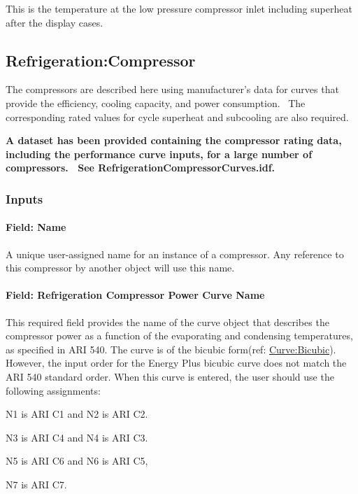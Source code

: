 This is the temperature at the low pressure compressor inlet including superheat after the display cases.

\subsection{Refrigeration:Compressor}\label{refrigerationcompressor}

The compressors are described here using manufacturer's data for curves that provide the efficiency, cooling capacity, and power consumption.~ The corresponding rated values for cycle superheat and subcooling are also required.

\textbf{A dataset has been provided containing the compressor rating data, including the performance curve inputs, for a large number of compressors.~ See RefrigerationCompressorCurves.idf.}

\subsubsection{Inputs}\label{inputs-5-023}

\paragraph{Field: Name}\label{field-name-6-017}

A unique user-assigned name for an instance of a compressor. Any reference to this compressor by another object will use this name.

\paragraph{Field: Refrigeration Compressor Power Curve Name}\label{field-refrigeration-compressor-power-curve-name}

This required field provides the name of the curve object that describes the compressor power as a function of the evaporating and condensing temperatures, as specified in ARI 540. The curve is of the bicubic form(ref: \hyperref[curvebicubic]{Curve:Bicubic}).~ However, the input order for the Energy Plus bicubic curve does not match the ARI 540 standard order. When this curve is entered, the user should use the following assignments:

N1 is ARI C1 and N2 is ARI C2.

N3 is ARI C4 and N4 is ARI C3.

N5 is ARI C6 and N6 is ARI C5,

N7 is ARI C7.

